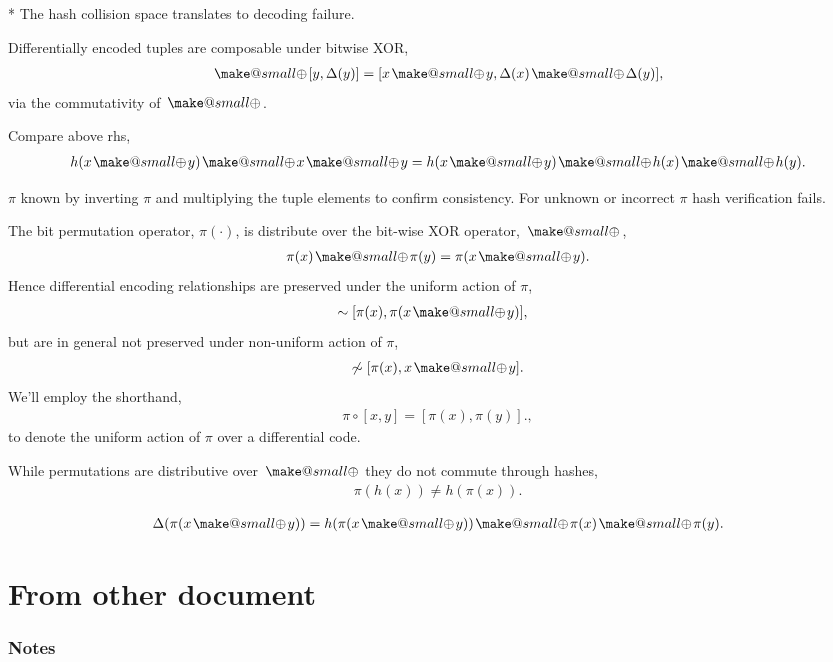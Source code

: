 \documentclass[twocolumn, aps, amsmath, amssymb, nofootinbib, superscriptaddress, longbibliography, doublefloatfix, table-of-contents, eqsecnum, rmp]{revtex4-2}
\makeatletter
\newcommand{\soplus}{{{\hspace{1pt}}{\mathbin{\mathpalette\make@small\oplus}}}{\hspace{1pt}}}
\newcommand{\make@small}[2]{%
  \vcenter{\hbox{%
    \scalebox{0.6}{$\m@th#1#2$}%
  }}%
}
\makeatother
\begin{document}
* The hash collision space translates to decoding failure.

Differentially encoded tuples are composable under bitwise XOR,
\begin{align}
	[x,\Delta(x)] \soplus [y,\Delta(y)] = [x\soplus y, \Delta(x)\soplus \Delta(y)],
\end{align}
via the commutativity of $\soplus$.

Compare above rhs,
\begin{align}
	h(x\soplus y) \soplus x \soplus y = h(x \soplus y) \soplus h(x) \soplus h(y).
\end{align}

$\pi$ known by inverting $\pi$ and multiplying the tuple elements to confirm consistency. For unknown or incorrect $\pi$ hash verification fails.

The bit permutation operator, $\pi(\cdot)$, is distribute over the bit-wise XOR operator, $\soplus$,
\begin{align}
	\pi(x)\soplus \pi(y) = \pi(x\soplus y).
\end{align}
Hence differential encoding relationships are preserved under the uniform action of $\pi$,
\begin{align}
	[x,x\soplus y] &\sim [\pi(x), \pi(x\soplus y)],
\end{align}
but are in general not preserved under non-uniform action of $\pi$,
\begin{align}
	[x,x\soplus y] \not\sim [\pi(x), x\soplus y].
\end{align}
We'll employ the shorthand,
\begin{align}
	\pi\circ[x,y] = [\pi(x),\pi(y)].,
\end{align}
to denote the uniform action of $\pi$ over a differential code.

While permutations are distributive over $\soplus$ they do not commute through hashes,
\begin{align}
	\pi(h(x)) \neq h(\pi(x)).	
\end{align}

\begin{align}
	\Delta(\pi(x\soplus y)) = h(\pi(x\soplus y)) \soplus \pi(x) \soplus \pi(y).
\end{align}

\section{From other document}

\subsubsection{Notes}
\end{document}
